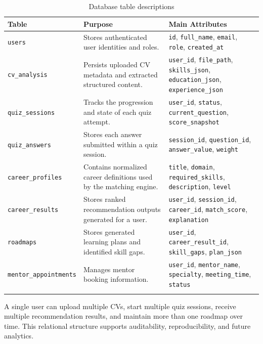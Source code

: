 \documentclass[12pt,a4paper]{article}
\begin{document}
\begin{longtable}{|p{3cm}|p{4.2cm}|p{6.8cm}|}
\hline
\textbf{Table} & \textbf{Purpose} & \textbf{Main Attributes} \\
\hline
\texttt{users}               & Stores authenticated user identities and roles.
                             & \texttt{id}, \texttt{full\_name}, \texttt{email}, \texttt{role}, \texttt{created\_at} \\
\hline
\texttt{cv\_analysis}        & Persists uploaded CV metadata and extracted structured content.
                             & \texttt{user\_id}, \texttt{file\_path}, \texttt{skills\_json}, \texttt{education\_json}, \texttt{experience\_json} \\
\hline
\texttt{quiz\_sessions}      & Tracks the progression and state of each quiz attempt.
                             & \texttt{user\_id}, \texttt{status}, \texttt{current\_question}, \texttt{score\_snapshot} \\
\hline
\texttt{quiz\_answers}       & Stores each answer submitted within a quiz session.
                             & \texttt{session\_id}, \texttt{question\_id}, \texttt{answer\_value}, \texttt{weight} \\
\hline
\texttt{career\_profiles}    & Contains normalized career definitions used by the matching engine.
                             & \texttt{title}, \texttt{domain}, \texttt{required\_skills}, \texttt{description}, \texttt{level} \\
\hline
\texttt{career\_results}     & Stores ranked recommendation outputs generated for a user.
                             & \texttt{user\_id}, \texttt{session\_id}, \texttt{career\_id}, \texttt{match\_score}, \texttt{explanation} \\
\hline
\texttt{roadmaps}            & Stores generated learning plans and identified skill gaps.
                             & \texttt{user\_id}, \texttt{career\_result\_id}, \texttt{skill\_gaps}, \texttt{plan\_json} \\
\hline
\texttt{mentor\_appointments}& Manages mentor booking information.
                             & \texttt{user\_id}, \texttt{mentor\_name}, \texttt{specialty}, \texttt{meeting\_time}, \texttt{status} \\
\hline
\caption{Database table descriptions}
\end{longtable}

A single user can upload multiple CVs, start multiple quiz sessions, receive multiple recommendation results, and maintain more than one roadmap over time. This relational structure supports auditability, reproducibility, and future analytics.
\end{document}
